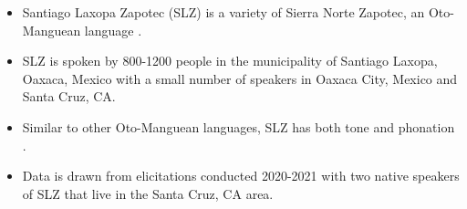 \documentclass[12pt, letterpaper]{article}
\begin{document}
\begin{itemize}
	\item Santiago Laxopa Zapotec (SLZ) is a variety of Sierra Norte Zapotec, an Oto-Manguean language \citep{adlerDerivationVerbInitiality2018,sichelFeaturalLifeNominals2020}.

	\item SLZ is spoken by 800-1200 people in the municipality of Santiago Laxopa, Oaxaca, Mexico with a small number of speakers in Oaxaca City, Mexico and Santa Cruz, CA. 

	\item Similar to other Oto-Manguean languages, SLZ has both tone and phonation \citep{campbellMesoAmericaLinguisticArea1986,stolzMesoamericaLinguisticArea2001,campbellOtomangueanHistoricalLinguistics2017a,campbellOtomangueanHistoricalLinguistics2017}. 

	\item Data is drawn from elicitations conducted 2020-2021 with two native speakers of SLZ that live in the Santa Cruz, CA area.  
\end{itemize}


\end{document}
